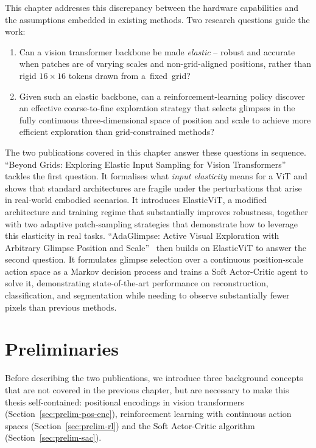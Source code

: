 This chapter addresses this discrepancy between the hardware capabilities and the assumptions embedded in existing methods. Two research questions guide the work:

\begin{enumerate}
    \item Can a vision transformer backbone be made \emph{elastic} -- robust and accurate when patches are of varying scales and non-grid-aligned positions, rather than rigid $16\times16$ tokens drawn from a~fixed~grid?
    \item Given such an elastic backbone, can a reinforcement-learning policy discover an effective coarse-to-fine exploration strategy that selects glimpses in the fully continuous three-dimensional space of position and scale to achieve more efficient exploration than grid-constrained methods?
\end{enumerate}

The two publications covered in this chapter answer these questions in sequence. ``Beyond Grids: Exploring Elastic Input Sampling for Vision Transformers''~ tackles the first question. It formalises what \emph{input elasticity} means for a ViT and shows that standard architectures are fragile under the perturbations that arise in real-world embodied scenarios. It introduces ElasticViT, a modified architecture and training regime that substantially improves robustness, together with two adaptive patch-sampling strategies that demonstrate how to leverage this elasticity in real tasks. ``AdaGlimpse: Active Visual Exploration with Arbitrary Glimpse Position and Scale''~ then builds on ElasticViT to answer the second question. It formulates glimpse selection over a continuous position-scale action space as a Markov decision process and trains a Soft Actor-Critic agent to solve it, demonstrating state-of-the-art performance on reconstruction, classification, and segmentation while needing to observe substantially fewer pixels than previous methods.

\section{Preliminaries}
\label{sec:adaptive-preliminaries}

Before describing the two publications, we introduce three background concepts that are not covered in the previous chapter, but are necessary to make this thesis self-contained: positional encodings in vision transformers (Section~\ref{sec:prelim-pos-enc}), reinforcement learning with continuous action spaces (Section~\ref{sec:prelim-rl}) and the Soft Actor-Critic algorithm (Section~\ref{sec:prelim-sac}).

